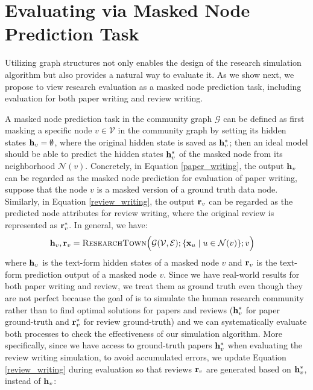 \section{Evaluating \envname via Masked Node Prediction Task}
\label{evaluation}
Utilizing graph structures not only enables the design of the research simulation algorithm but also provides a natural way to evaluate it. As we show next, we propose to view research evaluation as a masked node prediction task, including evaluation for both paper writing and review writing.


 A masked node prediction task in the community graph $\mathcal{G}$ can be defined as first masking a specific node $v \in \mathcal{V}$ in the community graph by setting its hidden states $\mathbf{h}_v = \emptyset$, where the original hidden state is saved as $\mathbf{h}_v^*$; then an ideal model should be able to predict the hidden states $\mathbf{h}_v^*$ of the masked node from its neighborhood $\mathcal{N}(v)$. Concretely, in Equation \ref{paper_writing}, the output $\mathbf{h}_v$ can be regarded as the masked node prediction for evaluation of paper writing, suppose that the node $v$ is a masked version of a ground truth data node. Similarly, in Equation \ref{review_writing}, the output $\mathbf{r}_v$ can be regarded as the predicted node attributes for review writing, where the original review is represented as $\mathbf{r}_v^*$.
In general, we have:\\

\vspace{-8mm}
\begingroup
\small
\begin{equation}
\begin{split}
\mathbf{h}_v, \mathbf{r}_v &= \textsc{ResearchTown}\Big(
    \mathcal{G}(\mathcal{V}, \mathcal{E}); \{\mathbf{x}_u \mid u \in \mathcal{N}(v)\}; v
\Big)
\end{split}
\end{equation}
\endgroup
where $\mathbf{h}_v$ is the text-form hidden states of a masked node $v$ and  $\mathbf{r}_v$ is the text-form prediction output of a masked node $v$. Since we have real-world results for both paper writing and review, we treat them as ground truth even though they are not perfect because the goal of \envname is to simulate the human research community rather than to find optimal solutions for papers and reviews ($\mathbf{h}_v^*$ for paper ground-truth and $\mathbf{r}_v^*$ for review ground-truth) and we can systematically evaluate both processes to check the effectiveness of our simulation algorithm. More specifically, since we have access to ground-truth papers $\mathbf{h}_v^*$ when evaluating the review writing simulation, to avoid accumulated errors, we update Equation \ref{review_writing} during evaluation so that reviews $\mathbf{r}_v$ are generated based on $\mathbf{h}_v^*$, instead of $\mathbf{h}_v$:

